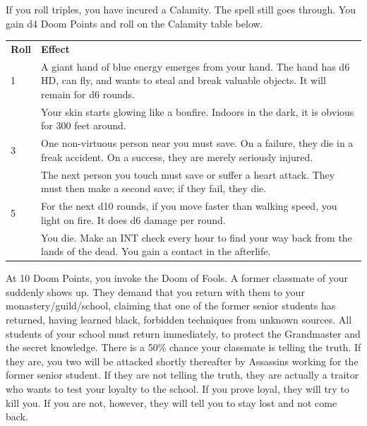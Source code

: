 \documentclass[twoside]{article}
\begin{document}
\bigbreak

If you roll triples, you have incured a Calamity. The spell still goes through. You gain d4 Doom Points and roll on the Calamity table below.

\bigbreak

\begin{center}
\noindent\begin{tabular}{>{\centering\arraybackslash}p{}p{}}
\textbf{Roll}&\textbf{Effect}\\
\rowcolor[gray]{0.75}1&A giant hand of blue energy emerges from your hand. The hand has d6 HD, can fly, and wants to steal and break valuable objects. It will remain for d6 rounds.\\
2&Your skin starts glowing like a bonfire. Indoors in the dark, it is obvious for 300 feet around.\\
\rowcolor[gray]{0.75}3&One non-virtuous person near you must save. On a failure, they die in a freak accident. On a success, they are merely seriously injured.\\
4&The next person you touch must save or suffer a heart attack. They must then make a second save; if they fail, they die.\\
\rowcolor[gray]{0.75}5&For the next d10 rounds, if you move faster than walking speed, you light on fire. It does d6 damage per round.\\
6&You die. Make an INT check every hour to find your way back from the lands of the dead. You gain a contact in the afterlife.\\
\end{tabular}
\end{center}

\bigbreak

At 10 Doom Points, you invoke the Doom of Fools. A former classmate of your suddenly shows up. They demand that you return with them to your monastery/guild/school, claiming that one of the former senior students has returned, having learned black, forbidden techniques from unknown sources. All students of your school must return immediately, to protect the Grandmaster and the secret knowledge. There is a 50\% chance your classmate is telling the truth. If they are, you two will be attacked shortly thereafter by Assassins working for the former senior student. If they are not telling the truth, they are actually a traitor who wants to test your loyalty to the school. If you prove loyal, they will try to kill you. If you are not, however, they will tell you to stay lost and not come back.
\end{document}
